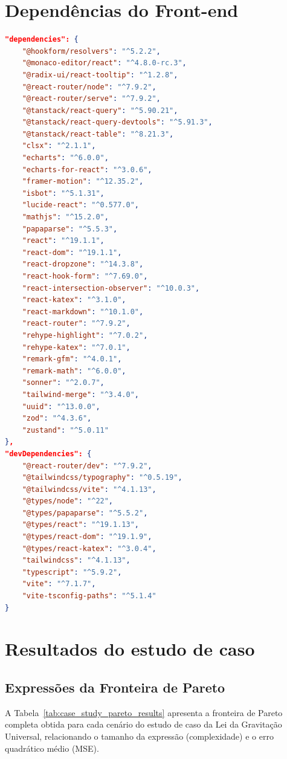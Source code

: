 \begin{apendicesenv}
\chapter{Dependências do Front-end}
\label{sec:appendix-frontend}
\begin{lstlisting}[language=json, caption={Ferramentas utilizadas no front-end e suas versões}, label=lst:frontend-dependencies]
"dependencies": {
    "@hookform/resolvers": "^5.2.2",
    "@monaco-editor/react": "^4.8.0-rc.3",
    "@radix-ui/react-tooltip": "^1.2.8",
    "@react-router/node": "^7.9.2",
    "@react-router/serve": "^7.9.2",
    "@tanstack/react-query": "^5.90.21",
    "@tanstack/react-query-devtools": "^5.91.3",
    "@tanstack/react-table": "^8.21.3",
    "clsx": "^2.1.1",
    "echarts": "^6.0.0",
    "echarts-for-react": "^3.0.6",
    "framer-motion": "^12.35.2",
    "isbot": "^5.1.31",
    "lucide-react": "^0.577.0",
    "mathjs": "^15.2.0",
    "papaparse": "^5.5.3",
    "react": "^19.1.1",
    "react-dom": "^19.1.1",
    "react-dropzone": "^14.3.8",
    "react-hook-form": "^7.69.0",
    "react-intersection-observer": "^10.0.3",
    "react-katex": "^3.1.0",
    "react-markdown": "^10.1.0",
    "react-router": "^7.9.2",
    "rehype-highlight": "^7.0.2",
    "rehype-katex": "^7.0.1",
    "remark-gfm": "^4.0.1",
    "remark-math": "^6.0.0",
    "sonner": "^2.0.7",
    "tailwind-merge": "^3.4.0",
    "uuid": "^13.0.0",
    "zod": "^4.3.6",
    "zustand": "^5.0.11"
},
"devDependencies": {
    "@react-router/dev": "^7.9.2",
    "@tailwindcss/typography": "^0.5.19",
    "@tailwindcss/vite": "^4.1.13",
    "@types/node": "^22",
    "@types/papaparse": "^5.5.2",
    "@types/react": "^19.1.13",
    "@types/react-dom": "^19.1.9",
    "@types/react-katex": "^3.0.4",
    "tailwindcss": "^4.1.13",
    "typescript": "^5.9.2",
    "vite": "^7.1.7",
    "vite-tsconfig-paths": "^5.1.4"
}
\end{lstlisting}

\chapter{Resultados do estudo de caso}
\label{sec:appendix-case-study-results}

\section{Expressões da Fronteira de Pareto}
\label{sec:appendix-pareto-front}
A Tabela~\ref{tab:case_study_pareto_results} apresenta a fronteira de Pareto completa obtida para cada cenário do estudo de caso da Lei da Gravitação Universal, relacionando o tamanho da expressão (complexidade) e o erro quadrático médio (MSE).


\end{apendicesenv}
